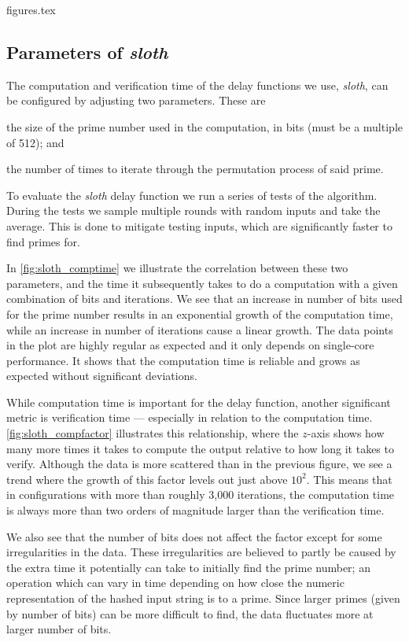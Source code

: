 {figures.tex}

\subsection{Parameters of \textit{sloth}}%
\label{sub:sloth_parameters}

The computation and verification time of the delay functions we use, \textit{sloth}, can be configured by adjusting two parameters.
These are
\begin{eletterate*}
\item the size of the prime number used in the computation, in bits (must be a multiple of 512); and
\item the number of times to iterate through the permutation process of said prime.
\end{eletterate*}

To evaluate the \textit{sloth} delay function we run a series of tests of the algorithm.
During the tests we sample multiple rounds with random inputs and take the average.
This is done to mitigate testing inputs, which are significantly faster to find primes for.

In \vref{fig:sloth_comptime} we illustrate the correlation between these two parameters, and the time it subsequently takes to do a computation with a given combination of bits and iterations.
We see that an increase in number of bits used for the prime number results in an exponential growth of the computation time, while an increase in number of iterations cause a linear growth.
The data points in the plot are highly regular as expected and it only depends on single-core performance. It shows that the computation time is reliable and grows as expected without significant deviations.

While computation time is important for the delay function, another significant metric is verification time --- especially in relation to the computation time.
\vref{fig:sloth_compfactor} illustrates this relationship, where the $z$-axis shows how many more times it takes to compute the output relative to how long it takes to verify.
Although the data is more scattered than in the previous figure, we see a trend where the growth of this factor levels out just above $10^2$.
This means that in configurations with more than roughly 3,000 iterations, the computation time is always more than two orders of magnitude larger than the verification time.

We also see that the number of bits does not affect the factor except for some irregularities in the data.
These irregularities are believed to partly be caused by the extra time it potentially can take to initially find the prime number; an operation which can vary in time depending on how close the numeric representation of the hashed input string is to a prime.
Since larger primes (given by number of bits) can be more difficult to find, the data fluctuates more at larger number of bits.
